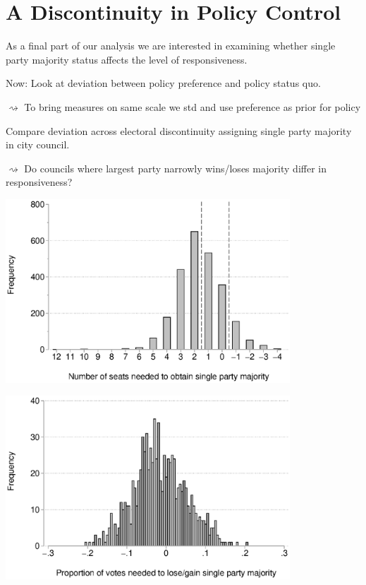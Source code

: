 \documentclass[10pt,aspectratio=169]{beamer}
\begin{document}
	\section[Policy Control]{A Discontinuity in Policy Control}
	
\begin{frame}			
As a final part of our analysis we are interested in examining whether single party majority status affects the level of responsiveness. 

\vspace{0.2in} \pause
Now: Look at deviation between policy preference and policy status quo.

$\rightsquigarrow$ To bring measures on same scale we std and use preference as prior for policy

\vspace{0.2in} \pause

Compare deviation across electoral discontinuity assigning single party majority in city council.

$\rightsquigarrow$ Do councils where largest party narrowly wins/loses majority differ in responsiveness?


\end{frame}

\begin{frame}		
\centering	
	\includegraphics[width=0.8\textwidth]{images/closeelec.eps}
\end{frame}

\begin{frame}
\centering			
\includegraphics[width=0.8\textwidth]{images/distpct.eps}
\end{frame}
\end{document}
